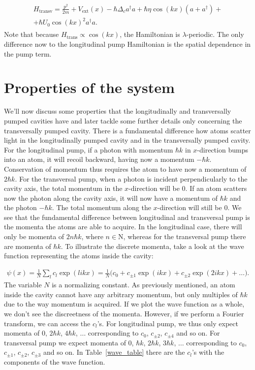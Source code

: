\begin{align}
\begin{split}
H_\text{transv} = \frac{p^2}{2m} + V_\text{ext}(x) - \hbar \Delta_c a^\dagger a + \hbar \eta \cos(kx) (a + a^\dagger) + \\
 + \hbar U_0 \cos(kx)^2 a^\dagger a.
\end{split}
\end{align}Note that because $H_\text{trans} \propto \cos(kx)$, the Hamiltonian is $\lambda$-periodic. The only difference now to the longitudinal pump Hamiltonian is the spatial dependence in the pump term.

\section{Properties of the system}

\noindent We'll now discuss some properties that the longitudinally and transversally pumped cavities have and later tackle some further details only concerning the transversally pumped cavity. There is a fundamental difference how atoms scatter light in the longitudinally pumped cavity and in the transversally pumped cavity. For the longitudinal pump, if a photon with momentum $\hbar k$ in $x$-direction bumps into an atom, it will recoil backward, having now a momentum $-\hbar k$. Conservation of momentum thus requires the atom to have now a momentum of $2\hbar k$. For the transversal pump, when a photon is incident perpendicularly to the cavity axis, the total momentum in the $x$-direction will be 0. If an atom scatters now the photon along the cavity axis, it will now have a momentum of $\hbar k$ and the photon $-\hbar k$. The total momentum along the $x$-direction will still be 0. We see that the fundamental difference between longitudinal and transversal pump is the momenta the atoms are able to acquire. In the longitudinal case, there will only be momenta of $2n\hbar k$, where $n \in \mathrm{N}$, whereas for the transversal pump there are momenta of $\hbar k$. To illustrate the discrete momenta, take a look at the wave function representing the atoms inside the cavity:

\begin{align}
\psi(x) = \frac{1}{N} \sum_{l} c_l \exp(likx) = \frac{1}{N} \Big( c_0 + c_{\pm 1} \exp(ikx) + c_{\pm 2} \exp(2ikx) + \dots \Big) .
\end{align}The variable $N$ is a normalizing constant. As previously mentioned, an atom inside the cavity cannot have any arbitrary momentum, but only multiples of $\hbar k$ due to the way momentum is acquired. If we plot the wave function as a whole, we don't see the discreetness of the momenta. However, if we perform a Fourier transform, we can access the $c_l$'s. For longitudinal pump, we thus only expect momenta of 0, $2 \hbar k$, $4 \hbar k$, $\dots$ corresponding to $c_0$, $c_{\pm 2}$, $c_{\pm 4}$ and so on. For transversal pump we expect momenta of 0, $\hbar k$, $2 \hbar k$, $3 \hbar k$, $\dots$ corresponding to $c_0$, $c_{\pm 1}$, $c_{\pm 2}$, $c_{\pm 3}$ and so on. In Table~\ref{wave_table} there are the $c_l$'s with the components of the wave function.

